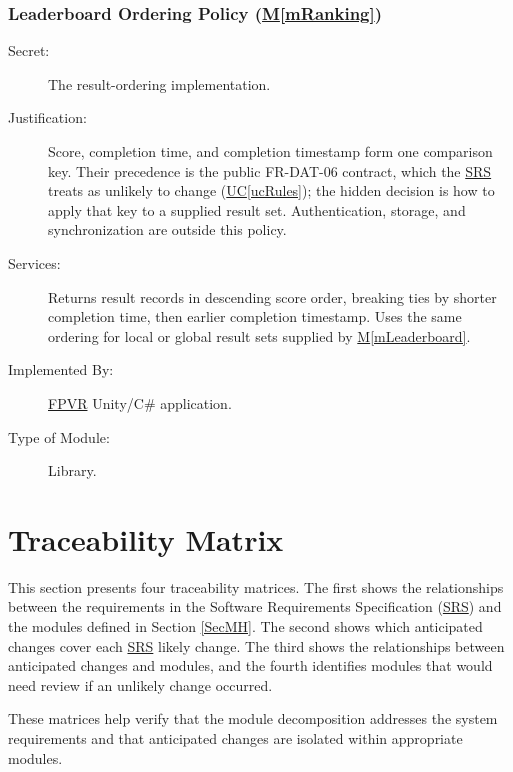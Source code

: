 \documentclass[12pt, titlepage]{article}
\DeclareRobustCommand{\mgabbr}[2]{\hyperlink{mg-abbr:#1}{#2}}
\newcommand{\uref}[1]{\mgabbr{uc}{UC}\ref{#1}}
\newcommand{\mref}[1]{\hyperref[#1]{M\ref*{#1}}}
\begin{document}
\subsubsection{Leaderboard Ordering Policy (\mref{mRanking})}

\begin{description}
\item[Secret:]
The result-ordering implementation.

\item[Justification:]
Score, completion time, and completion timestamp form one comparison key.
Their precedence is the public FR-DAT-06 contract, which the \mgabbr{srs}{SRS}
treats as
unlikely to change (\uref{ucRules}); the hidden decision is how to apply
that key to a supplied result set. Authentication, storage, and
synchronization are outside this policy.

\item[Services:]
Returns result records in descending score order, breaking ties by shorter
completion time, then earlier completion timestamp. Uses the same ordering
for local or global result sets supplied by \mref{mLeaderboard}.

\item[Implemented By:]
\mgabbr{fpvr}{FPVR} Unity/C\# application.

\item[Type of Module:]
Library.
\end{description}

\section{Traceability Matrix} \label{SecTM}

This section presents four traceability matrices. The first shows
the relationships between the requirements in the Software
Requirements Specification (\mgabbr{srs}{SRS}) and the modules defined in
Section \ref{SecMH}. The second shows which anticipated changes cover each
\mgabbr{srs}{SRS} likely change. The third shows the relationships between
anticipated
changes and modules, and the fourth identifies modules that would need
review if an unlikely change occurred.

These matrices help verify that the module decomposition
addresses the system requirements and that anticipated
changes are isolated within appropriate modules.


\end{document}
